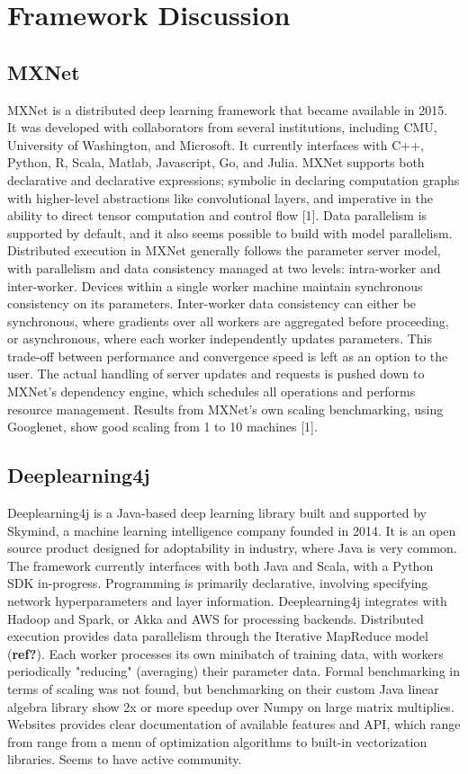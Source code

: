 \documentclass{article}
\begin{document}
\section{Framework Discussion}
\subsection{MXNet}
MXNet is a distributed deep learning framework that became available in 2015. It was developed with collaborators from several institutions, including CMU, University of Washington, and Microsoft. It currently interfaces with C++, Python, R, Scala, Matlab, Javascript, Go, and Julia. MXNet supports both declarative and declarative expressions; symbolic in declaring computation graphs with higher-level abstractions like convolutional layers, and imperative in the ability to direct tensor computation and control flow [1]. Data parallelism is supported by default, and it also seems possible to build with model parallelism. Distributed execution in MXNet generally follows the parameter server model, with parallelism and data consistency managed at two levels: intra-worker and inter-worker. Devices within a single worker machine maintain synchronous consistency on its parameters. Inter-worker data consistency can either be synchronous, where gradients over all workers are aggregated before proceeding, or asynchronous, where each worker independently updates parameters. This trade-off between performance and convergence speed is left as an option to the user. The actual handling of server updates and requests is pushed down to MXNet's dependency engine, which schedules all operations and performs resource management. Results from MXNet's own scaling benchmarking, using Googlenet, show good scaling from 1 to 10 machines [1]. 

\subsection{Deeplearning4j}
Deeplearning4j is a Java-based deep learning library built and supported by Skymind, a machine learning intelligence company founded in 2014. It is an open source product designed for adoptability in industry, where Java is very common. The framework currently interfaces with both Java and Scala, with a Python SDK in-progress. Programming is primarily declarative, involving specifying network hyperparameters and layer information. Deeplearning4j integrates with Hadoop and Spark, or Akka and AWS for processing backends. Distributed execution provides data parallelism through the Iterative MapReduce model (\textbf{ref?}). Each worker processes its own minibatch of training data, with workers periodically "reducing" (averaging) their parameter data. Formal benchmarking in terms of scaling was not found, but benchmarking on their custom Java linear algebra library show 2x or more speedup over Numpy on large matrix multiplies. Websites provides clear documentation of available features and API, which range from range from a menu of optimization algorithms to built-in vectorization libraries. Seems to have active community. 
\end{document}
